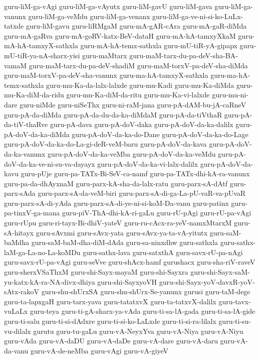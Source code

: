 {guru-liM-ga-vAgi
guru-liM-ga-vAyutx
guru-liM-gavU
guru-liM-gava
guru-liM-ga-vanunx
guru-liM-ga-veMdu
guru-liM-ga-venanx
guru-liM-ga-ve-ni-si-ko-LuLx-tatxde
guru-liM-gavu
guru-liRMgaM
guru-mA-gAR-cAra
guru-mA-gaR-diMda
guru-mA-gaRva
guru-mA-goRV-katx-BeV-dataH
guru-mA-hA-tamxyXkaM
guru-mA-hA-tamxyX-sathxla
guru-mA-hA-temx-sathxla
guru-mU-tiR-yA-gipapx
guru-mU-tiR-ya-nA-sharx-yisi
guru-maMtarx
guru-maM-tarx-du-pa-deV-sha-BA-vamaM
guru-maM-tarx-du-pa-deV-shadiM
guru-maM-torxV-pa-deV-sha-diMda
guru-maM-torxV-pa-deV-sha-vanunx
guru-ma-hA-tamxyX-sathxla
guru-ma-hA-temx-sathxla
guru-mu-Ka-da-lalx-lalxde
guru-mu-Kadi
guru-mu-Ka-diMda
guru-mu-Ka-diM-da-ridu
guru-mu-Ka-diM-da-ritu
guru-mu-Ka-vi-lalxde
guru-mu-ni-dare
guru-niMde
guru-niSeThx
guru-ni-raM-jana
guru-pA-dAM-bu-jA-caRneV
guru-pA-da-diMda
guru-pA-da-du-da-ka-diMdaM
guru-pA-da-tiVthaR
guru-pA-da-tiV-thaRve
guru-pA-dava
guru-pA-doV-daka
guru-pA-doV-da-ka-dalilx
guru-pA-doV-da-ka-diMda
guru-pA-doV-da-ka-do-Dane
guru-pA-doV-da-ka-do-Lage
guru-pA-doV-da-ka-do-La-gi-deR-veM-baru
guru-pA-doV-da-kava
guru-pA-doV-da-ka-vanunx
guru-pA-doV-da-ka-veMba
guru-pA-doV-da-ka-veMdu
guru-pA-doV-da-ka-ve-ni-su-va-dayayx
guru-pA-doV-da-ka-vi-lalx-dalilx
guru-pA-doV-da-kavu
guru-pUje
guru-pa-TATx-Bi-SeV-ca-namf
guru-pa-TATx-dhi-kA-ra-vanunx
guru-pa-da-dhAyxnaM
guru-parx-kA-sha-da-lalx-ratu
guru-parx-sA-dAtf
guru-parx-sAda
guru-parx-sA-da-veM-biri
guru-parx-sA-di-ga-La-pU-vaR-va-pUvaR
guru-parx-sA-di-yAda
guru-parx-sA-di-ye-ni-si-koM-Da-vanu
guru-patinx
guru-pa-tinxV-ga-mana
guru-piV-ThA-dhi-kA-ri-gaLu
guru-rU-pAgi
guru-rU-pa-vAgi
guru-rUpu
guru-ri-tayx-Bi-dhiV-yateV
guru-ru-cAcx-ra-yeV-namxMtarxM
guru-sA-hitayx
guru-sAvxmi
guru-sAvx-yata
guru-sAvx-ya-ta-vA-yitutx
guru-saM-baMdha
guru-saM-baM-dha-diM-dAda
guru-sa-ninxdhw
guru-sathxla
guru-sathx-laM-ga-La-no-La-koMDu
guru-sathx-lava
guru-satxthA
guru-savx-rU-pa-nAgi
guru-savx-rU-pa-vAgi
guru-seVve
guru-shAcx-hamf
gurushacx
guru-sha-riV-raveV
guru-sherxVSaThxM
guru-shi-Sayx-mayaM
guru-shi-Sayxra
guru-shi-Sayx-saM-yu-katx-kA-ra-NA-divx-dhiya
guru-shi-SayxyoVH
guru-shi-Sayx-yoV-davxR-yoV-sAtx-rakoV
guru-shu-shUrxSA
guru-shu-shUrx-Se-yanunx
gurusi
guru-taM-dege
guru-ta-lapxgaH
guru-tarx-yava
guru-tatatxvX
guru-ta-tatxvX-dalilx
guru-tavx-vuLaLx
guru-teya
guru-ti-gA-sharx-ya-vAda
guru-ti-sa-lA-gada
guru-ti-sa-lA-gide
guru-ti-salu
guru-ti-si-dAdxre
guru-ti-si-ko-LaLxde
guru-ti-si-ra-lilalx
guru-ti-su-vu-dilalx
gurutu
guru-tu-gaLu
guru-vA-NeyxYva
guru-vA-Niya
guru-vA-Niyu
guru-vAda
guru-vA-daDU
guru-vA-daDe
guru-vA-dare
guru-vA-daru
guru-vA-da-vanu
guru-vA-de-neMba
guru-vAgi
guru-vA-giyeV
}
